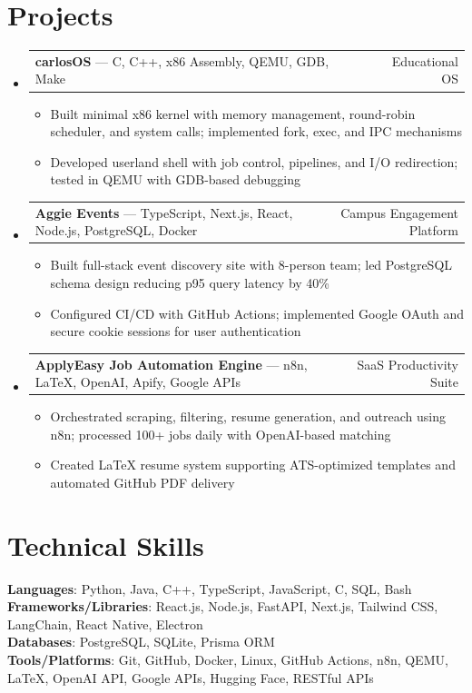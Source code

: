 \documentclass[letterpaper,11pt]{article}
\makeatletter
\newcommand{\resumeItem}[1]{
  \item\small{{#1 \vspace{-2pt}}}
}
\newcommand{\resumeProjectHeading}[2]{
    \item
    \begin{tabular*}{0.97\textwidth}{l@{\extracolsep{\fill}}r}
      \small#1 & #2 \\
    \end{tabular*}\vspace{-7pt}
}
\newcommand{\resumeSubHeadingListStart}{\begin{itemize}[leftmargin=0.15in, label={}]}
\newcommand{\resumeSubHeadingListEnd}{\end{itemize}}
\newcommand{\resumeItemListStart}{\begin{itemize}}
\newcommand{\resumeItemListEnd}{\end{itemize}\vspace{-5pt}}
\makeatother
\begin{document}
\section{Projects}
\resumeSubHeadingListStart
\resumeProjectHeading
  {\textbf{carlosOS} — C, C++, x86 Assembly, QEMU, GDB, Make}{Educational OS}
  \resumeItemListStart
    \resumeItem{Built minimal x86 kernel with memory management, round-robin scheduler, and system calls; implemented fork, exec, and IPC mechanisms}
    \resumeItem{Developed userland shell with job control, pipelines, and I/O redirection; tested in QEMU with GDB-based debugging}
  \resumeItemListEnd

\resumeProjectHeading
  {\textbf{Aggie Events} — TypeScript, Next.js, React, Node.js, PostgreSQL, Docker}{Campus Engagement Platform}
  \resumeItemListStart
    \resumeItem{Built full-stack event discovery site with 8-person team; led PostgreSQL schema design reducing p95 query latency by 40\%}
    \resumeItem{Configured CI/CD with GitHub Actions; implemented Google OAuth and secure cookie sessions for user authentication}
  \resumeItemListEnd

\resumeProjectHeading
  {\textbf{ApplyEasy Job Automation Engine} — n8n, LaTeX, OpenAI, Apify, Google APIs}{SaaS Productivity Suite}
  \resumeItemListStart
    \resumeItem{Orchestrated scraping, filtering, resume generation, and outreach using n8n; processed 100+ jobs daily with OpenAI-based matching}
    \resumeItem{Created LaTeX resume system supporting ATS-optimized templates and automated GitHub PDF delivery}
  \resumeItemListEnd
\resumeSubHeadingListEnd

\section{Technical Skills}
\begin{itemize}[leftmargin=0.15in, label={}]
  \small{\item{
    \textbf{Languages}{: Python, Java, C++, TypeScript, JavaScript, C, SQL, Bash} \\
    \textbf{Frameworks/Libraries}{: React.js, Node.js, FastAPI, Next.js, Tailwind CSS, LangChain, React Native, Electron} \\
    \textbf{Databases}{: PostgreSQL, SQLite, Prisma ORM} \\
    \textbf{Tools/Platforms}{: Git, GitHub, Docker, Linux, GitHub Actions, n8n, QEMU, LaTeX, OpenAI API, Google APIs, Hugging Face, RESTful APIs}
  }}
\end{itemize}
\end{document}
